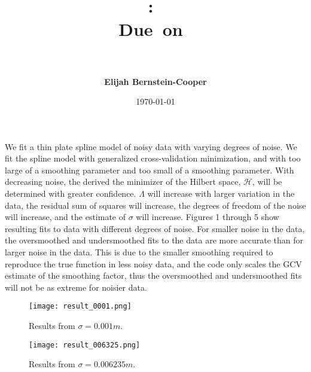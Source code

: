 \documentclass[11pt]{article}
\title{\vspace{0in}
    \textmd{\textbf{\hmwkClass:\ \hmwkTitle}}\\
    \normalsize\vspace{0.1in}\small{Due\ on\ \hmwkDueDate}\\
    \vspace{0.1in}\large{\textit{\hmwkClassInstructor\ \hmwkClassTime}}
    \vspace{0.2in}}
\author{\textbf{Elijah Bernstein-Cooper}}
\date{\today} %
\begin{document}
\maketitle

\begin{homeworkProblem}

    We fit a thin plate spline model of noisy data with varying degrees of
    noise. We fit the spline model with generalized cross-validation
    minimization, and with too large of a smoothing parameter and too small of
    a smoothing parameter. With decreasing noise, the derived the minimizer of
    the Hilbert space, $\mathcal{H}$, will be determined with greater
    confidence. $\Lambda$ will increase with larger variation in the data, the
    residual sum of squares will increase, the degrees of freedom of the noise
    will increase, and the estimate of $\sigma$ will increase. Figures 1
    through 5 show resulting fits to data with different degrees of noise. For
    smaller noise in the data, the oversmoothed and undersmoothed fits to the
    data are more accurate than for larger noise in the data. This is due to
    the smaller smoothing required to reproduce the true function in less noisy
    data, and the code only scales the GCV estimate of the smoothing factor,
    thus the oversmoothed and undersmoothed fits will not be as extreme for
    noisier data.
    
        \begin{figure}[!ht]
            
            \begin{centering}
                \texttt{[image: result\_0001.png]}

            \caption{Results from $\sigma = 0.001m$.}

            \end{centering}
        \end{figure}

        \begin{figure}[!ht]
            
            \begin{centering}
                \texttt{[image: result\_006325.png]}

            \caption{Results from $\sigma = 0.006235m$.}


\end{centering}
\end{figure}
\end{homeworkProblem}
\end{document}
